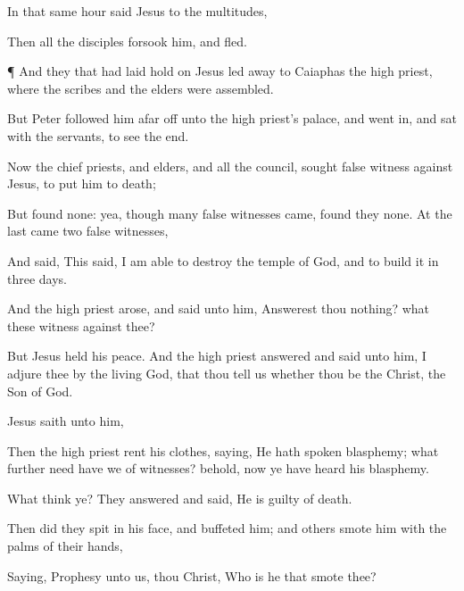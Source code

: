 {

In that
same
hour
said
Jesus to the
multitudes,
{}

Then
all the
disciples
forsook
him, and
fled.


\par }{\PP {}¶
And they that had laid hold
on
Jesus
led
{}
away
to
Caiaphas the high
priest,
where the
scribes
and the
elders were
assembled.

But
Peter
followed
him
afar
off
unto the high
priest’s
palace,
and
went
in, and
sat
with the
servants, to
see the
end.

Now the chief
priests,
and
elders,
and
all the
council,
sought false
witness
against
Jesus,
to
put
him to
death;

But
found
none: yea,
though
many false
witnesses
came,
{} found
they
none. At the
last
came
two false
witnesses,

And
said,
This
{}
said, I am
able to
destroy the
temple of
God,
and to
build
it
in
three
days.

And the high
priest
arose, and
said unto
him, Answerest
thou
nothing?
what
{}
these witness
against
thee?

But
Jesus held his
peace.
And the high
priest
answered and
said unto
him, I
adjure
thee
by
the
living
God,
that thou
tell
us
whether
thou
be the
Christ, the
Son of
God.

Jesus
saith unto
him,
{}

Then the high
priest
rent
his
clothes,
saying, He hath spoken
blasphemy;
what
further
need have
we of
witnesses?
behold,
now ye have
heard
his
blasphemy.

What
think
ye? They
answered
and
said, He
is guilty
of
death.

Then did they
spit
in
his
face,
and
buffeted
him;
and
others smote him with the palms of their
hands,

Saying,
Prophesy unto
us, thou
Christ,
Who is
he that
smote
thee?


}
